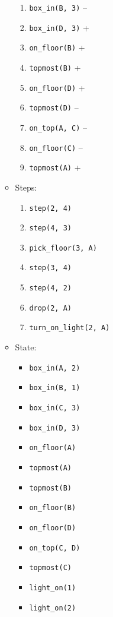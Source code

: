 \documentclass[12pt]{article}
\begin{document}
\begin{enumerate}
\begin{itemize}
\begin{enumerate}
          \item \texttt{box\_in(B, 3)} --
          \item \texttt{box\_in(D, 3)} +
          \item \texttt{on\_floor(B)} +
          \item \texttt{topmost(B)} +
          \item \texttt{on\_floor(D)} +
          \item \texttt{topmost(D)} --
          \item \texttt{on\_top(A, C)} --
          \item \texttt{on\_floor(C)} --
          \item \texttt{topmost(A)} +
        \end{enumerate}
      \item Steps:
        \begin{enumerate}
          \item \texttt{step(2, 4)}
          \item \texttt{step(4, 3)}
          \item \texttt{pick\_floor(3, A)}
          \item \texttt{step(3, 4)}
          \item \texttt{step(4, 2)}
          \item \texttt{drop(2, A)}
          \item \texttt{turn\_on\_light(2, A)}
        \end{enumerate}
      \item State:
        \begin{itemize}
          \item \texttt{box\_in(A, 2)}
          \item \texttt{box\_in(B, 1)}
          \item \texttt{box\_in(C, 3)}
          \item \texttt{box\_in(D, 3)}
          \item \texttt{on\_floor(A)}
          \item \texttt{topmost(A)}
          \item \texttt{topmost(B)}
          \item \texttt{on\_floor(B)}
          \item \texttt{on\_floor(D)}
          \item \texttt{on\_top(C, D)}
          \item \texttt{topmost(C)}
          \item \texttt{light\_on(1)}
          \item \texttt{light\_on(2)}

\end{itemize}
\end{itemize}
\end{enumerate}
\end{document}
